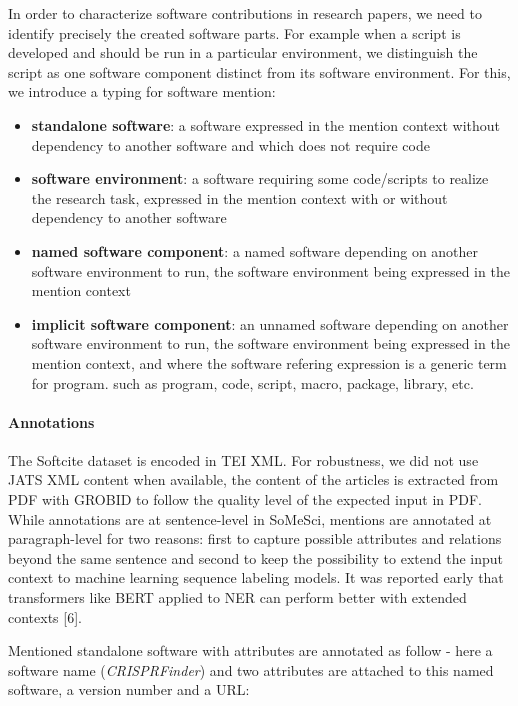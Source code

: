 \documentclass[
]{article}
\begin{document}
In order to characterize software contributions in research papers, we
need to identify precisely the created software parts. For example when
a script is developed and should be run in a particular environment, we
distinguish the script as one software component distinct from its
software environment. For this, we introduce a typing for software
mention:

\begin{itemize}
\item
  \textbf{standalone software}: a software expressed in the mention
  context without dependency to another software and which does not
  require code
\item
  \textbf{software environment}: a software requiring some code/scripts
  to realize the research task, expressed in the mention context with or
  without dependency to another software
\item
  \textbf{named software component}: a named software depending on
  another software environment to run, the software environment being
  expressed in the mention context
\item
  \textbf{implicit software component}: an unnamed software depending on
  another software environment to run, the software environment being
  expressed in the mention context, and where the software refering
  expression is a generic term for program. such as program, code,
  script, macro, package, library, etc.
\end{itemize}

\hypertarget{annotations}{%
\paragraph{Annotations}\label{annotations}}

The Softcite dataset is encoded in TEI XML. For robustness, we did not
use JATS XML content when available, the content of the articles is
extracted from PDF with GROBID to follow the quality level of the
expected input in PDF. While annotations are at sentence-level in
SoMeSci, mentions are annotated at paragraph-level for two reasons:
first to capture possible attributes and relations beyond the same
sentence and second to keep the possibility to extend the input context
to machine learning sequence labeling models. It was reported early that
transformers like BERT applied to NER can perform better with extended
contexts {[}6{]}.

Mentioned standalone software with attributes are annotated as follow -
here a software name (\emph{CRISPRFinder}) and two attributes are
attached to this named software, a version number and a URL:
\end{document}
